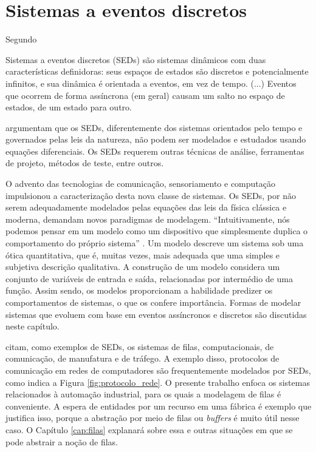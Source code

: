 \chapter{Sistemas a eventos discretos}
\label{cap:seds}

Segundo  \begin{citacao} Sistemas a eventos discretos (\acs{SED}s) são sistemas dinâmicos com duas características definidoras: seus espaços de estados são discretos e potencialmente infinitos, e sua dinâmica é orientada a eventos, em vez de tempo. (...) Eventos que ocorrem de forma assíncrona (em geral) causam um salto no espaço de estados, de um estado para outro. \end{citacao}  argumentam que os SEDs, diferentemente dos sistemas orientados pelo tempo e governados pelas leis da natureza, não podem ser modelados e estudados usando equações diferenciais. Os SEDs requerem outras técnicas de análise, ferramentas de projeto, métodos de teste, entre outros.

O advento das tecnologias de comunicação, sensoriamento e computação impulsionou a caracterização desta nova classe de sistemas. Os SEDs, por não serem adequadamente modelados pelas equações das leis da física clássica e moderna, demandam novos paradigmas de modelagem. ``Intuitivamente, nós podemos pensar em um modelo como um dispositivo que simplesmente duplica o comportamento do próprio sistema'' \cite[p. 3, tradução do autor]{cassandras}. Um modelo descreve um sistema sob uma ótica quantitativa, que é, muitas vezes, mais adequada que uma simples e subjetiva descrição qualitativa. A construção de um modelo considera um conjunto de variáveis de entrada e saída, relacionadas por intermédio de uma função. Assim sendo, os modelos proporcionam a habilidade predizer os comportamentos de sistemas, o que os confere importância. Formas de modelar sistemas que evoluem com base em eventos assíncronos e discretos são discutidas neste capítulo.

 citam, como exemplos de SEDs, os sistemas de filas, computacionais, de comunicação, de manufatura e de tráfego. A exemplo disso, protocolos de comunicação em redes de computadores são frequentemente modelados por SEDs, como indica a Figura \ref{fig:protocolo_rede}. O presente trabalho enfoca os sistemas relacionados à automação industrial, para os quais a modelagem de filas é conveniente. A espera de entidades por um recurso em uma fábrica é exemplo que justifica isso, porque a abstração por meio de filas ou \textit{buffers} é muito útil nesse caso. O Capítulo \ref{cap:filas} explanará sobre essa e outras situações em que se pode abstrair a noção de filas.

